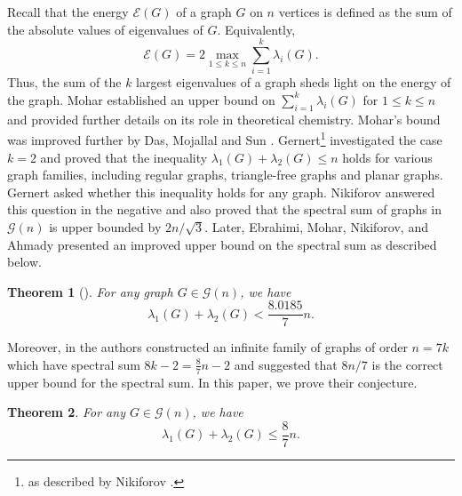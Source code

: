 \documentclass[11pt]{article}
\theoremstyle{plain}
\newtheorem{theorem}{Theorem}[section]
\theoremstyle{definition}
\numberwithin{equation}{section}
\begin{document}
Recall that the energy $\mathcal{E}(G)$ of a graph $G$ on $n$ vertices is defined 
as the sum of the absolute values of eigenvalues of $G$. Equivalently,
\[
\mathcal{E}(G) = 2\max_{1\leq k\leq n} \sum_{i=1}^k \lambda_i(G).
\]
Thus, the sum of the $k$ largest eigenvalues of a graph sheds light on the energy of the graph. 
Mohar \cite{Mohar_2009} established an upper bound on $\sum_{i=1}^k \lambda_i(G)$ for 
$1 \leq k \leq n$ and provided further details on its role in theoretical chemistry. 
Mohar's bound was improved further by Das, Mojallal and Sun \cite{Das_Ahmad_Sun_2019}. 
Gernert\footnote{as described by Nikiforov \cite{Nikiforov_2006_2}.} investigated the case $k=2$ 
and proved that the inequality $\lambda_1 (G) + \lambda_2 (G) \leq n$ holds for various graph 
families, including regular graphs, triangle-free graphs and planar graphs. Gernert asked whether 
this inequality holds for any graph. Nikiforov \cite{Nikiforov_2006_2} answered this question 
in the negative and also proved that the spectral sum of graphs in $\mathcal{G}(n)$ is upper 
bounded by $2n/\sqrt{3}$. Later, Ebrahimi, Mohar, Nikiforov, and 
Ahmady \cite{Ebrahimi_Mohar_Nikiforov_Ahmady_2008} presented an improved upper bound on 
the spectral sum as described below.

\begin{theorem}[\cite{Ebrahimi_Mohar_Nikiforov_Ahmady_2008}]\label{thm:mohar_specsum}
For any graph $G\in \mathcal{G}(n)$, we have 
\[ 
\lambda_1(G)+\lambda_2(G) < \frac{8.0185}{7} n.
\] 
\end{theorem}

Moreover, in \cite{Ebrahimi_Mohar_Nikiforov_Ahmady_2008} the authors constructed an infinite 
family of graphs of order $n = 7k$ which have spectral sum $8k -2 = \frac{8}{7}n-2$ and 
suggested that $8n/7$ is the correct upper bound for the spectral sum. In this paper, we prove their conjecture.  

\begin{theorem}\label{thm:upper_bound_8_over_7_graph} 
For any $G\in \mathcal{G}(n)$, we have
\[
\lambda_1(G) + \lambda_2(G) \leq \frac{8}{7} n.
\]
\end{theorem}
\end{document}
